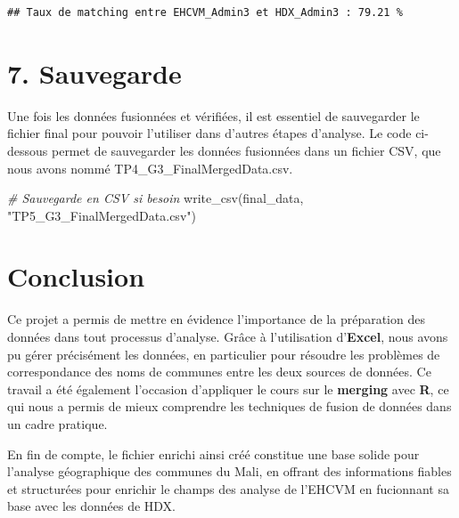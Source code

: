 \documentclass[
]{article}
\newenvironment{Shaded}{\begin{snugshade}}{\end{snugshade}}
\newcommand{\CommentTok}[1]{\textcolor[rgb]{0.56,0.35,0.01}{\textit{#1}}}
\newcommand{\FunctionTok}[1]{\textcolor[rgb]{0.00,0.00,0.00}{#1}}
\newcommand{\NormalTok}[1]{#1}
\newcommand{\StringTok}[1]{\textcolor[rgb]{0.31,0.60,0.02}{#1}}
\begin{document}
\begin{verbatim}
## Taux de matching entre EHCVM_Admin3 et HDX_Admin3 : 79.21 %
\end{verbatim}

\hypertarget{sauvegarde}{%
\section{7. Sauvegarde}\label{sauvegarde}}

Une fois les données fusionnées et vérifiées, il est essentiel de
sauvegarder le fichier final pour pouvoir l'utiliser dans d'autres
étapes d'analyse. Le code ci-dessous permet de sauvegarder les données
fusionnées dans un fichier CSV, que nous avons nommé
TP4\_G3\_FinalMergedData.csv.

\begin{Shaded}
\begin{Highlighting}[]
\CommentTok{\# Sauvegarde en CSV si besoin}
\FunctionTok{write\_csv}\NormalTok{(final\_data, }\StringTok{"TP5\_G3\_FinalMergedData.csv"}\NormalTok{)}
\end{Highlighting}
\end{Shaded}

\hypertarget{conclusion}{%
\section{Conclusion}\label{conclusion}}

Ce projet a permis de mettre en évidence l'importance de la préparation
des données dans tout processus d'analyse. Grâce à l'utilisation
d'\textbf{Excel}, nous avons pu gérer précisément les données, en
particulier pour résoudre les problèmes de correspondance des noms de
communes entre les deux sources de données. Ce travail a été également
l'occasion d'appliquer le cours sur le \textbf{merging} avec \textbf{R},
ce qui nous a permis de mieux comprendre les techniques de fusion de
données dans un cadre pratique.

En fin de compte, le fichier enrichi ainsi créé constitue une base
solide pour l'analyse géographique des communes du Mali, en offrant des
informations fiables et structurées pour enrichir le champs des analyse
de l'EHCVM en fucionnant sa base avec les données de HDX.
\end{document}
